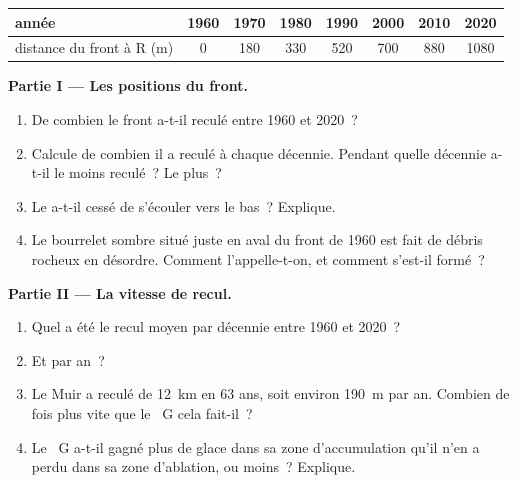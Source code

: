 \begin{problem}
\begin{center}
\smallskip
{\small
\begin{tabular}{|l|c|c|c|c|c|c|c|}
\hline
année & 1960 & 1970 & 1980 & 1990 & 2000 & 2010 & 2020 \\
\hline
distance du front à R (m) & 0 & 180 & 330 & 520 & 700 & 880 & 1080 \\
\hline
\end{tabular}}
\end{center}

\noindent\textbf{Partie I --- Les positions du front.}\par\nopagebreak
\begin{enumerate}[beginpenalty=10000]
  \item De combien le front a-t-il reculé entre 1960 et 2020~?
  \item Calcule de combien il a reculé à chaque décennie. Pendant quelle
        décennie a-t-il le moins reculé~? Le plus~?
  \item Le  a-t-il cessé de s'écouler vers le bas~? Explique.
  \item Le bourrelet sombre situé juste en aval du front de 1960 est fait
        de débris rocheux en désordre. Comment l'appelle-t-on, et comment
        s'est-il formé~?
\end{enumerate}

\noindent\textbf{Partie II --- La vitesse de recul.}\par\nopagebreak
\begin{enumerate}[resume, beginpenalty=10000]
  \item Quel a été le recul moyen par décennie entre 1960 et 2020~?
  \item Et par an~?
  \item Le  Muir a reculé de \qty{12}{km} en 63 ans, soit environ
        \qty{190}{m} par an. Combien de fois plus vite que le ~G
        cela fait-il~?
  \item Le ~G a-t-il gagné plus de glace dans sa zone d'accumulation
        qu'il n'en a perdu dans sa zone d'ablation, ou moins~? Explique.
\end{enumerate}


\end{problem}
